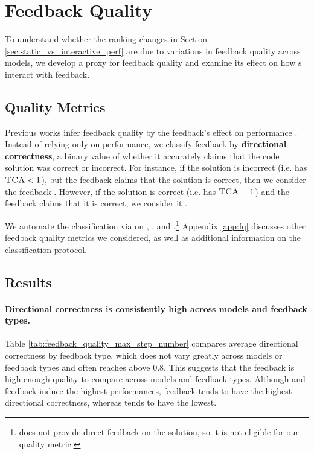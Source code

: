 \section{Feedback Quality}
To understand whether the ranking changes in Section \ref{sec:static_vs_interactive_perf} are due to variations in feedback quality across models, we develop a proxy for feedback quality and examine its effect on how \cm s interact with feedback.


\subsection{Quality Metrics}
Previous works infer feedback quality by the feedback's effect on performance \cite{zhang2023clarifynecessaryresolvingambiguity}.  
Instead of relying only on performance, we classify feedback by \textbf{directional correctness}, a binary value of whether it accurately claims that the code solution was correct or incorrect. 
For instance, if the solution is incorrect (i.e. has $\textsc{TCA} < 1$), but the feedback claims that the solution is correct, then we consider the feedback \lqf.
However, if the solution is correct (i.e. has $\textsc{TCA} = 1$) and the feedback claims that it is correct, we consider it \hqf.

We automate the classification via \gpt{} on \sent, \para, and \cf{}.\footnote{\ir{} does not provide direct feedback on the solution, so it is not eligible for our quality metric.}
Appendix \ref{app:fq} discusses other feedback quality metrics we considered, as well as additional information on the classification protocol. 

\subsection{Results}


\paragraph{Directional correctness is consistently high across models and feedback types.}
Table \ref{tab:feedback_quality_max_step_number} compares average directional correctness by feedback type, which does not vary greatly across models or feedback types and often reaches above $0.8$.
This suggests that the feedback is high enough quality to compare across models and feedback types.
Although \para{} and \cf{} feedback induce the highest performances, \para{} feedback tends to have the highest directional correctness, whereas \cf{} tends to have the lowest.

